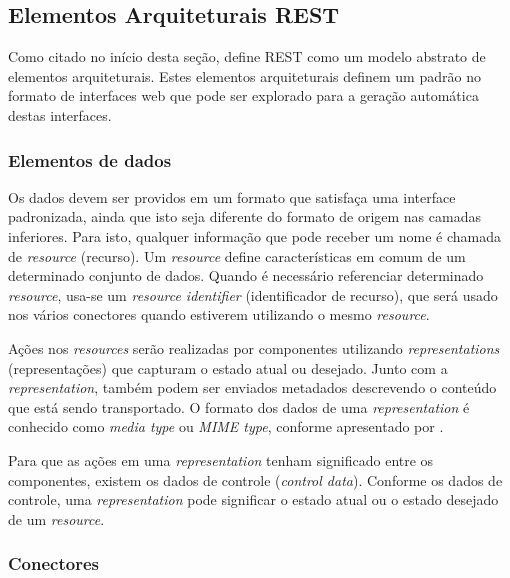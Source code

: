 
\subsection{Elementos Arquiteturais REST}

Como citado no início desta seção,  define REST como um modelo abstrato de elementos arquiteturais. Estes elementos arquiteturais definem um padrão no formato de interfaces web que pode ser explorado para a geração automática destas interfaces.


\subsubsection{Elementos de dados}
Os dados devem ser providos em um formato que satisfaça uma interface padronizada, ainda que isto seja diferente do formato de origem nas camadas inferiores. Para isto, qualquer informação que pode receber um nome é chamada de \textit{resource} (recurso). Um \textit{resource} define características em comum de um determinado conjunto de dados. Quando é necessário referenciar determinado \textit{resource}, usa-se um \textit{resource identifier} (identificador de recurso), que será usado nos vários conectores quando estiverem utilizando o mesmo \textit{resource}.

Ações nos \textit{resources} serão realizadas por componentes utilizando \textit{representations} (representações) que capturam o estado atual ou desejado. Junto com a \textit{representation}, também podem ser enviados metadados descrevendo o conteúdo que está sendo transportado. O formato dos dados de uma \textit{representation} é conhecido como \textit{media type} ou \textit{MIME type}, conforme apresentado por .

Para que as ações em uma \textit{representation} tenham significado entre os componentes, existem os dados de controle (\textit{control data}). Conforme os dados de controle, uma \textit{representation} pode significar o estado atual ou o estado desejado de um \textit{resource}.


\subsubsection{Conectores}


